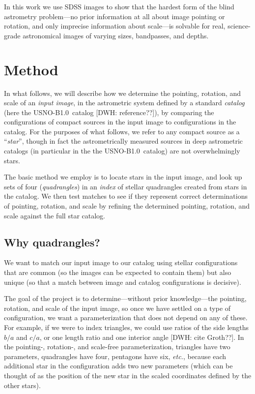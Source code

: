 \documentclass[12pt,preprint]{aastex}
\newcommand{\latin}[1]{\textit{#1}}
\newcommand{\etc}{\latin{etc.}}
\newcommand{\usnob}{USNO-B1.0}
\begin{document}
In this work we use SDSS images to show that the hardest form of the
blind astrometry problem---no prior information at all about image
pointing or rotation, and only imprecise information about scale---is
solvable for real, science-grade astronomical images of varying sizes,
bandpasses, and depths.

\section{Method}

In what follows, we will describe how we determine the pointing,
rotation, and scale of an \textit{input image}, in the astrometric
system defined by a standard \textit{catalog} (here the \usnob\
catalog [DWH: reference??]), by comparing the configurations of
compact sources in the input image to configurations in the catalog.
For the purposes of what follows, we refer to any compact source as a
``\textit{star}'', though in fact the astrometrically measured sources
in deep astrometric catalogs (in particular in the the \usnob\
catalog) are not overwhelmingly stars.

The basic method we employ is to locate stars in the input image, and
look up sets of four (\textit{quadrangles}) in an \textit{index} of
stellar quadrangles created from stars in the catalog.  We then test
matches to see if they represent correct determinations of pointing,
rotation, and scale by refining the determined pointing, rotation, and
scale against the full star catalog.

\subsection{Why quadrangles?}

We want to match our input image to our catalog using stellar
configurations that are common (so the images can be expected to
contain them) but also unique (so that a match between image and
catalog configurations is decisive).

The goal of the project is to determine---without prior
knowledge---the pointing, rotation, and scale of the input image, so
once we have settled on a type of configuration, we want a
parameterization that does not depend on any of these.  For example,
if we were to index triangles, we could use ratios of the side lengths
$b/a$ and $c/a$, or one length ratio and one interior angle [DWH: cite
Groth??].  In the pointing-, rotation-, and scale-free
parameterization, triangles have two parameters, quadrangles have
four, pentagons have six, \etc, because each additional star in the
configuration adds two new parameters (which can be thought of as the
position of the new star in the scaled coordinates defined by the
other stars).
\end{document}
